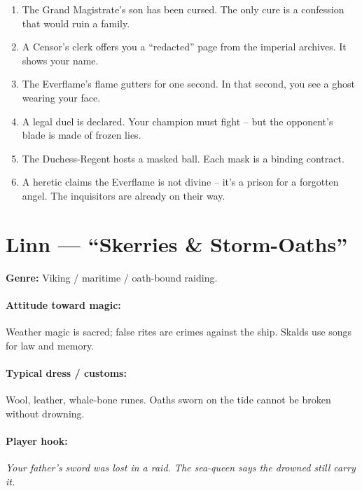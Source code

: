 \begin{tcolorbox}[colback=gray!5!white, colframe=gray!70!black, title=Ecktoria Mini-Generator (d6),breakable]
\begin{enumerate}
\item The Grand Magistrate's son has been cursed. The only cure is a confession that would ruin a family.
\item A Censor's clerk offers you a ``redacted'' page from the imperial archives. It shows your name.
\item The Everflame's flame gutters for one second. In that second, you see a ghost wearing your face.
\item A legal duel is declared. Your champion must fight -- but the opponent's blade is made of frozen lies.
\item The Duchess-Regent hosts a masked ball. Each mask is a binding contract.
\item A heretic claims the Everflame is not divine -- it's a prison for a forgotten angel. The inquisitors are already on their way.
\end{enumerate}
\end{tcolorbox}

\section{Linn --- ``Skerries \& Storm-Oaths''}
\textbf{Genre:} Viking / maritime / oath-bound raiding.

\paragraph{Attitude toward magic:} Weather magic is sacred; false rites are crimes against the ship. Skalds use songs for law and memory.

\paragraph{Typical dress / customs:} Wool, leather, whale-bone runes. Oaths sworn on the tide cannot be broken without drowning.

\paragraph{Player hook:} \emph{Your father's sword was lost in a raid. The sea-queen says the drowned still carry it.}

